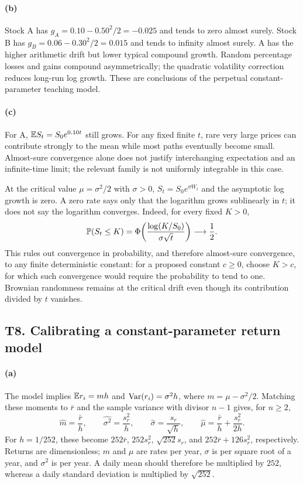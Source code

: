 \paragraph{(b)} Stock A has $g_A=0.10-0.50^2/2=-0.025$ and tends to zero almost surely. Stock B has $g_B=0.06-0.30^2/2=0.015$ and tends to infinity almost surely. A has the higher arithmetic drift but lower typical compound growth. Random percentage losses and gains compound asymmetrically; the quadratic volatility correction reduces long-run log growth. These are conclusions of the perpetual constant-parameter teaching model.
\paragraph{(c)} For A, $\mathbb E S_t=S_0e^{0.10t}$ still grows. For any fixed finite $t$, rare very large prices can contribute strongly to the mean while most paths eventually become small. Almost-sure convergence alone does not justify interchanging expectation and an infinite-time limit; the relevant family is not uniformly integrable in this case.

At the critical value $\mu=\sigma^2/2$ with $\sigma>0$, $S_t=S_0e^{\sigma W_t}$ and the asymptotic log growth is zero. A zero rate says only that the logarithm grows sublinearly in $t$; it does not say the logarithm converges. Indeed, for every fixed $K>0$,
\[
 \mathbb P(S_t\le K)=\Phi\!\left(\frac{\log(K/S_0)}{\sigma\sqrt t}\right)
 \longrightarrow\frac12.
\]
This rules out convergence in probability, and therefore almost-sure convergence, to any finite deterministic constant: for a proposed constant $c\ge0$, choose $K>c$, for which such convergence would require the probability to tend to one. Brownian randomness remains at the critical drift even though its contribution divided by $t$ vanishes.

\subsection{T8. Calibrating a constant-parameter return model}
\paragraph{(a)} The model implies $\mathbb E r_i=mh$ and $\operatorname{Var}(r_i)=\sigma^2h$, where $m=\mu-\sigma^2/2$. Matching these moments to $\bar r$ and the sample variance with divisor $n-1$ gives, for $n\ge2$,
\[
 \widehat m=\frac{\bar r}{h},\qquad
 \widehat{\sigma^2}=\frac{s_r^2}{h},\qquad
 \widehat\sigma=\frac{s_r}{\sqrt h},\qquad
 \widehat\mu=\frac{\bar r}{h}+\frac{s_r^2}{2h}.
\]
For $h=1/252$, these become $252\bar r$, $252s_r^2$, $\sqrt{252}s_r$, and $252\bar r+126s_r^2$, respectively. Returns are dimensionless; $m$ and $\mu$ are rates per year, $\sigma$ is per square root of a year, and $\sigma^2$ is per year. A daily mean should therefore be multiplied by $252$, whereas a daily standard deviation is multiplied by $\sqrt{252}$.

